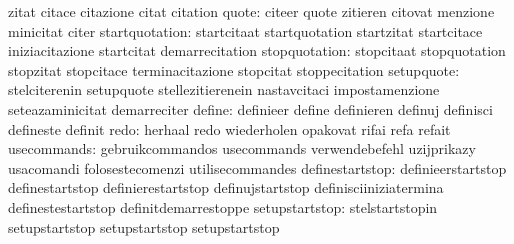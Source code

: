                                   zitat                            citace
                                  citazione                        citat
                                  citation
                           quote: citeer                           quote
                                  zitieren                         citovat
                                  menzione                         minicitat
                                  citer
                  startquotation: startcitaat                      startquotation
                                  startzitat                       startcitace
                                  iniziacitazione                  startcitat
                                  demarrecitation
                   stopquotation: stopcitaat                       stopquotation
                                  stopzitat                        stopcitace
                                  terminacitazione                 stopcitat
                                  stoppecitation
                      setupquote: stelciterenin                    setupquote
                                  stellezitierenein                nastavcitaci
                                  impostamenzione                  seteazaminicitat
                                  demarreciter
                          define: definieer                        define
                                  definieren                       definuj
                                  definisci                        defineste
                                  definit
                            redo: herhaal                          redo
                                  wiederholen                      opakovat
                                  rifai                            refa
                                  refait
                     usecommands: gebruikcommandos                 usecommands
                                  verwendebefehl                   uzijprikazy
                                  usacomandi                       folosestecomenzi
                                  utilisecommandes
                 definestartstop: definieerstartstop               definestartstop
                                  definierestartstop               definujstartstop
                                  definisciiniziatermina           definestestartstop
                                  definitdemarrestoppe
                  setupstartstop: stelstartstopin                  setupstartstop
                                  setupstartstop                   setupstartstop
